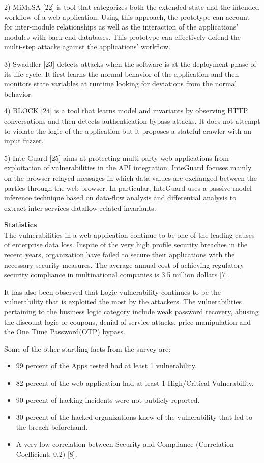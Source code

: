 \documentclass[11pt]{article}
\begin{document}
2) MiMoSA [22] is tool that categorizes both the extended state and the intended workflow of a web application. Using this approach, the prototype can account for inter-module relationships as well as the interaction of the applications' modules with back-end databases. This prototype can effectively defend the multi-step attacks against the applications' workflow.

3) Swaddler [23] detects attacks when the software is at the deployment phase of its life-cycle. It first learns the normal behavior of the application and then monitors state variables at runtime looking for deviations from the normal behavior.

4) BLOCK [24] is a tool that learns model and invariants by observing HTTP conversations and then detects authentication bypass attacks. It does not attempt to violate the logic of the application but it proposes a stateful crawler with an input fuzzer.

5) Inte-Guard [25] aims at protecting multi-party web applications from exploitation of vulnerabilities in the API integration. InteGuard focuses mainly on the browser-relayed messages in which data values are exchanged between the parties through the web browser. In particular, InteGuard uses a passive model inference technique based on data-flow analysis and differential analysis to extract inter-services dataflow-related invariants.

\textbf{Statistics}\\
 The vulnerabilities in a web application continue to be one of the leading causes of enterprise data loss. Inspite of the very high profile security breaches in the recent years, organization have failed to secure their applications with the necessary security measures. The average annual cost of achieving regulatory security compliance in multinational companies is 3.5 million dollars [7]. 
 
 It has also been observed that Logic vulnerability continues to be the vulnerability that is exploited the most by the attackers. The vulnerabilities pertaining to the business logic category include weak password recovery, abusing the discount logic or coupons, denial of service attacks, price manipulation and the One Time Password(OTP) bypass.
 
 Some of the other startling facts from the survey are: 
 \begin{itemize}
  \item 99 percent of the Apps tested had at least 1 vulnerability.
  \item 82 percent of the web application had at least 1 High/Critical Vulnerability.
  \item 90 percent of hacking incidents were not publicly reported.
  \item 30 percent of the hacked organizations knew of the vulnerability that led to the breach beforehand.
  \item A very low correlation between Security and Compliance (Correlation Coefficient: 0.2) [8].
\end{itemize}
\end{document}
